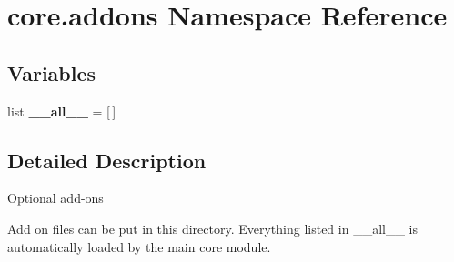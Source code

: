 \hypertarget{namespacecore_1_1addons}{\section{core.\+addons Namespace Reference}
\label{namespacecore_1_1addons}
}
\subsection*{Variables}
\begin{DoxyCompactItemize}
\item 
\hypertarget{namespacecore_1_1addons_a680b0f6391e9b2a08a7695f070fd82fc}{list {\bfseries \+\_\+\+\_\+all\+\_\+\+\_\+} = \mbox{[}$\,$\mbox{]}}\label{namespacecore_1_1addons_a680b0f6391e9b2a08a7695f070fd82fc}

\end{DoxyCompactItemize}


\subsection{Detailed Description}
\begin{DoxyVerb}Optional add-ons

Add on files can be put in this directory.  Everything listed in
__all__ is automatically loaded by the main core module.
\end{DoxyVerb}
 